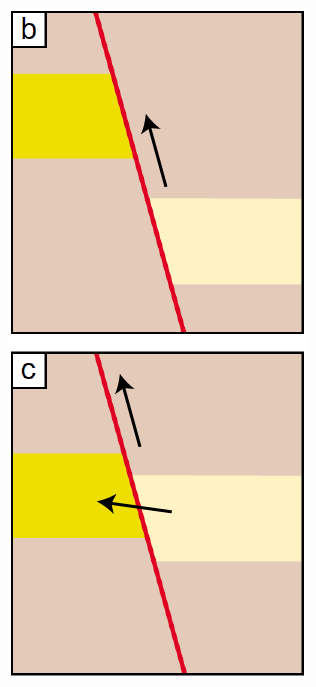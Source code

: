 \begin{figure}[h]
\begin{subfigure}{0.18\textwidth}
				\includegraphics[width=1\linewidth]{Figures/fault_trap_mechB1}

\end{subfigure}
\end{figure}
